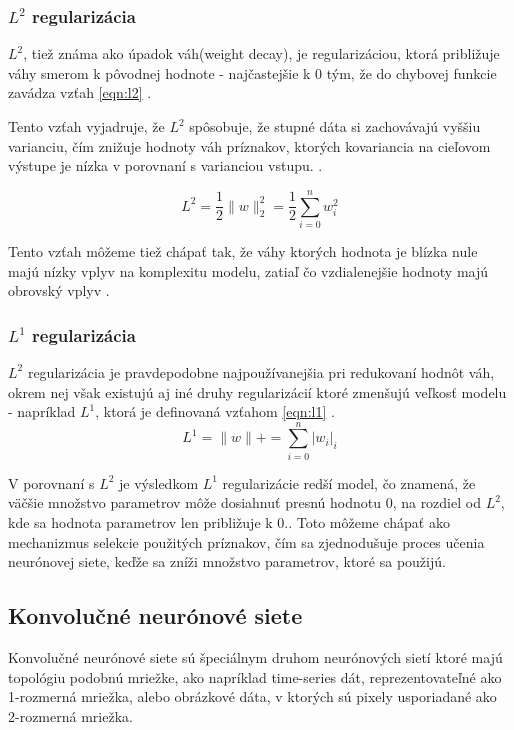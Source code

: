 \subsubsection{$L^2$ regularizácia}
$L^2$, tiež známa ako úpadok váh(weight decay), je regularizáciou, ktorá približuje váhy smerom k pôvodnej hodnote - najčastejšie k 0 tým, že do chybovej funkcie zavádza vzťah \eqref{eqn:l2} \cite{Regulari14}.

Tento vzťah vyjadruje, že $L^2$ spôsobuje, že stupné dáta si zachovávajú vyššiu varianciu,  čím znižuje hodnoty váh príznakov, ktorých kovariancia na cieľovom výstupe je nízka v porovnaní s varianciou vstupu. \cite{van2017l2}.

\begin{equation}\label{eqn:l2}
	L^2 = \frac{1}{2} \parallel w \parallel^2_{2} = \frac{1}{2}\sum\limits_{i=0}^n w^2_{i}
\end{equation}

\indent Tento vzťah môžeme tiež chápať tak, že váhy ktorých hodnota je blízka nule majú nízky vplyv na komplexitu modelu, zatiaľ čo vzdialenejšie hodnoty majú obrovský vplyv \cite{Regulari14}.

\subsubsection{$L^1$ regularizácia}
$L^2$ regularizácia je pravdepodobne najpoužívanejšia pri redukovaní hodnôt váh, okrem nej však existujú aj iné druhy regularizácií ktoré zmenšujú veľkosť modelu - napríklad $L^1$, ktorá je definovaná vzťahom \eqref{eqn:l1} \cite{goodfellow2016deep}.
\begin{equation}\label{eqn:l1}
	L^1 =  \parallel w \parallel{+} = \sum\limits_{i=0}^n \lvert w_{i} \rvert_{i}
\end{equation}

\indent V porovnaní s $L^2$ je výsledkom $L^1$ regularizácie redší model, čo znamená, že väčšie množstvo parametrov môže dosiahnuť presnú hodnotu 0, na rozdiel od $L^2$, kde sa hodnota parametrov len približuje k 0.\cite{Regulari75}. 
Toto môžeme chápať ako mechanizmus selekcie použitých príznakov, čím sa zjednodušuje proces učenia neurónovej siete, keďže sa zníži množstvo parametrov, ktoré sa použijú.

\subsection{Konvolučné neurónové siete}
Konvolučné neurónové siete sú špeciálnym druhom neurónových sietí ktoré majú topológiu podobnú mriežke, ako napríklad time-series dát, reprezentovateľné ako 1-rozmerná mriežka, alebo obrázkové dáta, v ktorých sú pixely usporiadané ako 2-rozmerná mriežka\cite{goodfellow2016deep}.


